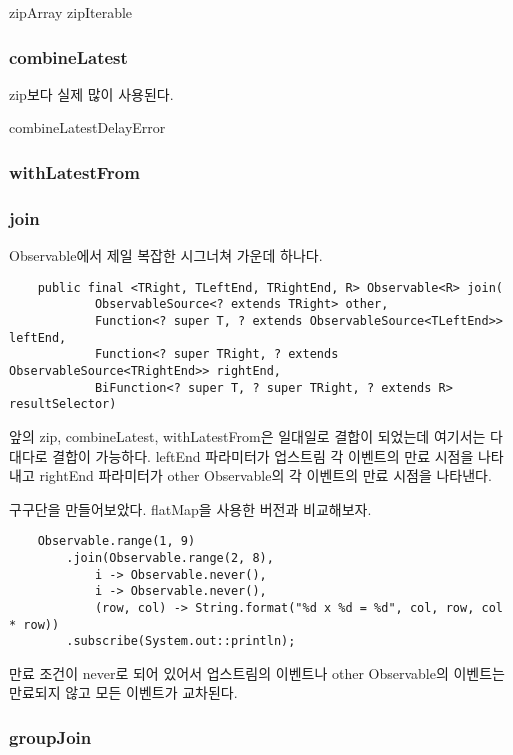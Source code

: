 \documentclass{book}
\begin{document}
{zipArray
zipIterable

\subsubsection{combineLatest}
zip보다 실제 많이 사용된다.

combineLatestDelayError

\subsubsection{withLatestFrom}

\subsubsection{join}
Observable에서 제일 복잡한 시그너쳐 가운데 하나다. 
\begin{verbatim}
    public final <TRight, TLeftEnd, TRightEnd, R> Observable<R> join(
            ObservableSource<? extends TRight> other,
            Function<? super T, ? extends ObservableSource<TLeftEnd>> leftEnd,
            Function<? super TRight, ? extends ObservableSource<TRightEnd>> rightEnd,
            BiFunction<? super T, ? super TRight, ? extends R> resultSelector)
\end{verbatim}
앞의 zip, combineLatest, withLatestFrom은 일대일로 결합이 되었는데 여기서는 다대다로 결합이 가능하다.
leftEnd 파라미터가 업스트림 각 이벤트의 만료 시점을 나타내고 rightEnd 파라미터가 other Observable의 각 이벤트의 만료 시점을 나타낸다.

구구단을 만들어보았다. flatMap을 사용한 버전과 비교해보자.
\begin{verbatim}
    Observable.range(1, 9)
        .join(Observable.range(2, 8),
            i -> Observable.never(),
            i -> Observable.never(),
            (row, col) -> String.format("%d x %d = %d", col, row, col * row))
        .subscribe(System.out::println);
\end{verbatim}
만료 조건이 never로 되어 있어서 업스트림의 이벤트나 other Observable의 이벤트는 만료되지 않고 모든 이벤트가 교차된다.

\subsubsection{groupJoin}

}
\end{document}
